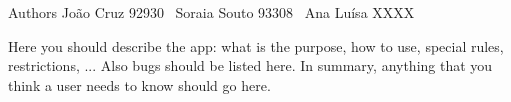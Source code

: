 \begin{DoxyAuthor}{Authors}
João Cruz 92930~\newline
 Soraia Souto 93308~\newline
 Ana Luísa X\+X\+XX
\end{DoxyAuthor}
Here you should describe the app\+: what is the purpose, how to use, special rules, restrictions, ... Also bugs should be listed here. In summary, anything that you think a user needs to know should go here. 